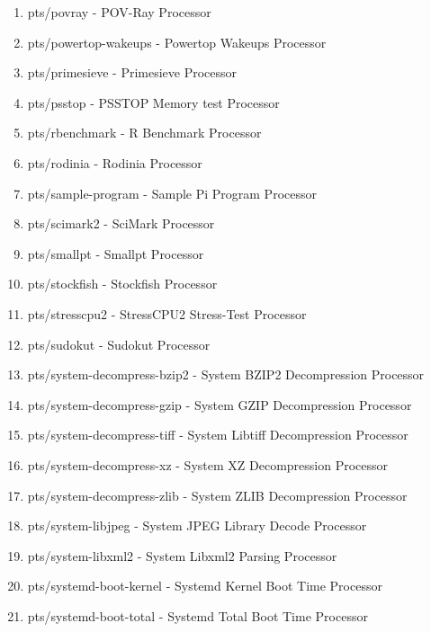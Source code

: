 \documentclass[french]{article}
\begin{document}
\begin{enumerate}
\item pts/povray                     - POV-Ray                             Processor
\item pts/powertop-wakeups           - Powertop Wakeups                    Processor
\item pts/primesieve                 - Primesieve                          Processor
\item pts/psstop                     - PSSTOP Memory test                  Processor
\item pts/rbenchmark                 - R Benchmark                         Processor
\item pts/rodinia                    - Rodinia                             Processor
\item pts/sample-program             - Sample Pi Program                   Processor
\item pts/scimark2                   - SciMark                             Processor
\item pts/smallpt                    - Smallpt                             Processor
\item pts/stockfish                  - Stockfish                           Processor
\item pts/stresscpu2                 - StressCPU2 Stress-Test              Processor
\item pts/sudokut                    - Sudokut                             Processor
\item pts/system-decompress-bzip2    - System BZIP2 Decompression          Processor
\item pts/system-decompress-gzip     - System GZIP Decompression           Processor
\item pts/system-decompress-tiff     - System Libtiff Decompression        Processor
\item pts/system-decompress-xz       - System XZ Decompression             Processor
\item pts/system-decompress-zlib     - System ZLIB Decompression           Processor
\item pts/system-libjpeg             - System JPEG Library Decode          Processor
\item pts/system-libxml2             - System Libxml2 Parsing              Processor
\item pts/systemd-boot-kernel        - Systemd Kernel Boot Time            Processor
\item pts/systemd-boot-total         - Systemd Total Boot Time             Processor

\end{enumerate}
\end{document}
